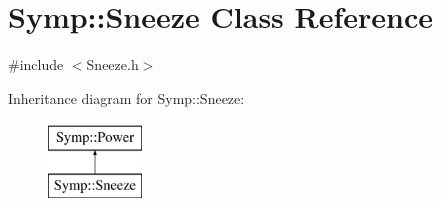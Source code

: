 \hypertarget{class_symp_1_1_sneeze}{\section{Symp\-:\-:Sneeze Class Reference}
\label{class_symp_1_1_sneeze}
}


{\ttfamily \#include $<$Sneeze.\-h$>$}

Inheritance diagram for Symp\-:\-:Sneeze\-:\begin{figure}[H]
\begin{center}
\leavevmode
\includegraphics[height=2.000000cm]{class_symp_1_1_sneeze}
\end{center}
\end{figure}
